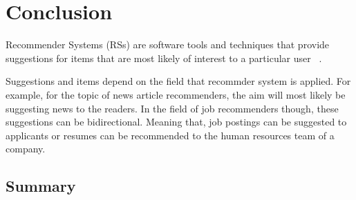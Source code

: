 
\chapter{Conclusion}\label{chapter:conclusion}

Recommender Systems (RSs) are software tools and techniques that provide suggestions for items that are most likely of interest to a particular user ~\parencite{Ricci2015}. 

Suggestions and items depend on the field that recommder system is applied. For example, for the topic of news article recommenders, the aim will most likely be suggesting news to the readers. In the field of job recommenders though, these suggestions can be bidirectional. Meaning that, job postings can be suggested to applicants or resumes can be recommended to the human resources team of a company.


\section{Summary}
